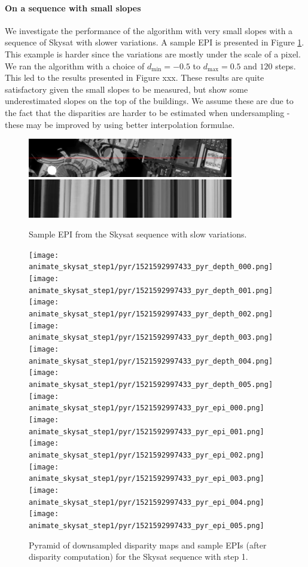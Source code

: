 \documentclass{article}
\def\epiWidth{0.8}
\theoremstyle{definition}
\begin{document}
\paragraph{On a sequence with small slopes}


We investigate the performance of the algorithm with very small slopes with a sequence of Skysat with slower variations. A sample EPI is presented in Figure \ref{fig:epi:skysat1}. This example is harder since the variations are mostly under the scale of a pixel. We ran the algorithm with a choice of $d_{\min} = -0.5$ to $d_{\max} = 0.5$ and $120$ steps. This led to the results presented in Figure xxx. These results are quite satisfactory given the small slopes to be measured, but show some underestimated slopes on the top of the buildings. We assume these are due to the fact that the disparities are harder to be estimated when undersampling - these may be improved by using better interpolation formulae.

\begin{figure}[ht]
  \centering
  \includegraphics[width=\epiWidth\textwidth]{images/1521592293547_1st.png}\\
  \includegraphics[width=\epiWidth\textwidth]{images/1521592293547_epi.png}
  \caption{Sample EPI from the Skysat sequence with slow variations.}
  \label{fig:epi:skysat1}
\end{figure}


\begin{figure}[ht]
  \centering
  \texttt{[image: animate\_skysat\_step1/pyr/1521592997433\_pyr\_depth\_000.png]}
  \texttt{[image: animate\_skysat\_step1/pyr/1521592997433\_pyr\_depth\_001.png]}
  \texttt{[image: animate\_skysat\_step1/pyr/1521592997433\_pyr\_depth\_002.png]}
  \texttt{[image: animate\_skysat\_step1/pyr/1521592997433\_pyr\_depth\_003.png]}
  \texttt{[image: animate\_skysat\_step1/pyr/1521592997433\_pyr\_depth\_004.png]}
  \texttt{[image: animate\_skysat\_step1/pyr/1521592997433\_pyr\_depth\_005.png]} \\
  \texttt{[image: animate\_skysat\_step1/pyr/1521592997433\_pyr\_epi\_000.png]}
  \texttt{[image: animate\_skysat\_step1/pyr/1521592997433\_pyr\_epi\_001.png]}
  \texttt{[image: animate\_skysat\_step1/pyr/1521592997433\_pyr\_epi\_002.png]}
  \texttt{[image: animate\_skysat\_step1/pyr/1521592997433\_pyr\_epi\_003.png]}
  \texttt{[image: animate\_skysat\_step1/pyr/1521592997433\_pyr\_epi\_004.png]}
  \texttt{[image: animate\_skysat\_step1/pyr/1521592997433\_pyr\_epi\_005.png]}
  \caption{Pyramid of downsampled disparity maps and sample EPIs (after disparity computation) for the Skysat sequence with step 1.}
  \label{fig:pyramid:skysat1}
\end{figure}
\end{document}
